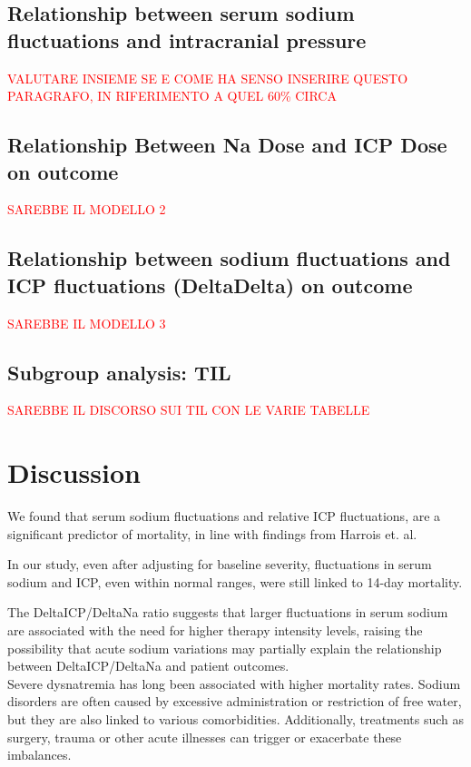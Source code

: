 \subsection{Relationship between serum sodium fluctuations and intracranial pressure}
\textcolor{red}{VALUTARE INSIEME SE E COME HA SENSO INSERIRE QUESTO PARAGRAFO, IN RIFERIMENTO A QUEL 60\% CIRCA}

\subsection{Relationship Between Na Dose and ICP Dose on outcome}
\textcolor{red}{SAREBBE IL MODELLO 2}

\subsection{Relationship between sodium fluctuations and ICP fluctuations (DeltaDelta) on outcome}
\textcolor{red}{SAREBBE IL MODELLO 3}

\subsection{Subgroup analysis: TIL}
\textcolor{red}{SAREBBE IL DISCORSO SUI TIL CON LE VARIE TABELLE}


\section{Discussion}
We found that  serum sodium fluctuations and relative ICP fluctuations, are a significant predictor of mortality, in line with findings from Harrois et. al.\cite{harroisVariabilitySerumSodium2021a}

In our study, even after adjusting for baseline severity, fluctuations in serum sodium and ICP, even within normal ranges, were still linked to 14-day mortality.

The DeltaICP/DeltaNa ratio suggests that larger fluctuations in serum sodium are associated with the need for higher therapy intensity levels, raising the possibility that acute sodium variations may partially explain the relationship between DeltaICP/DeltaNa and patient outcomes.\\

Severe dysnatremia has long been associated with higher mortality rates. Sodium disorders are often caused by excessive administration or restriction of free water, but they are also linked to various comorbidities. Additionally, treatments such as surgery\cite{marshallAssociationSodiumFluctuations2017}\cite{sakrFluctuationsSerumSodium2013}, trauma or other acute illnesses\cite{senSodiumVariabilityAssociated2017a} can trigger or exacerbate these imbalances.

